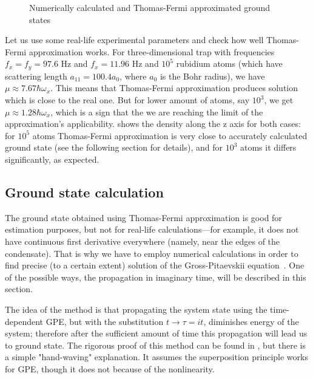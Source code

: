 \begin{figure}
\begin{center}
\end{center}
\caption{Numerically calculated and Thomas-Fermi approximated ground states}
\label{fig:mean-field:tf-vs-accurate}
\end{figure}

Let us use some real-life experimental parameters and check how well Thomas-Fermi approximation works.
For three-dimensional trap with frequencies $f_x = f_y = 97.6 \textrm{ Hz}$ and $f_x = 11.96 \textrm{ Hz}$
and $10^5$ rubidium atoms (which have scattering length $a_{11} = 100.4 a_0$, where $a_0$ is the Bohr radius),
we have $\mu \approx 7.67 \hbar \omega_x$.
This means that Thomas-Fermi approximation produces solution which is close to the real one.
But for lower amount of atoms, say $10^3$, we get $\mu \approx 1.28 \hbar \omega_x$,
which is a sign that the we are reaching the limit of the approximation's applicability.
 shows the density along the z axis for both cases:
for $10^5$ atoms Thomas-Fermi approximation is very close to accurately calculated ground state (see the following section for details),
and for $10^3$ atoms it differs significantly, as expected.


\subsection{Ground state calculation}

The ground state obtained using Thomas-Fermi approximation is good for estimation purposes,
but not for real-life calculations---for example, it does not have continuous first derivative everywhere
(namely, near the edges of the condensate).
That is why we have to employ numerical calculations in order to find precise (to a certain extent) solution
of the Gross-Pitaevskii equation~.
One of the possible ways, the propagation in imaginary time, will be described in this section.

The idea of the method is that propagating the system state using the time-dependent GPE,
but with the substitution $t \rightarrow \tau = it$, diminishes energy of the system;
therefore after the sufficient amount of time this propagation will lead us to ground state.
The rigorous proof of this method can be found in \cite{Bao2004}, but there is a simple "hand-waving" explanation.
It assumes the superposition principle works for GPE, though it does not because of the nonlinearity.

